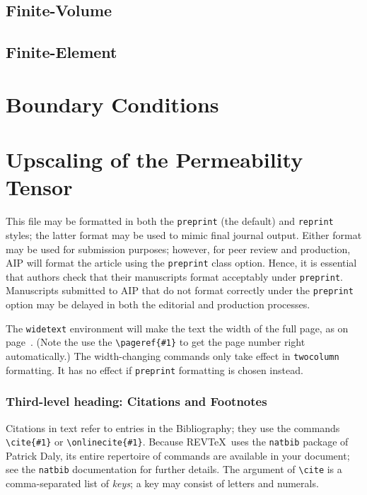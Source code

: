 \documentclass[%
 aip,
 jmp,%
 amsmath,amssymb,
 reprint,%
]{revtex4-1}
\begin{document}
\subsection{\label{sec:finite_volume}Finite-Volume}

\subsection{\label{sec:finite_element}Finite-Element}

\section{\label{sec:boundary_conditions}Boundary Conditions}

\section{\label{sec:upscaling}Upscaling of the Permeability Tensor}

This file may be formatted in both the \texttt{preprint} (the default) and
\texttt{reprint} styles; the latter format may be used to 
mimic final journal output. Either format may be used for submission
purposes; however, for peer review and production, AIP will format the
article using the \texttt{preprint} class option. Hence, it is
essential that authors check that their manuscripts format acceptably
under \texttt{preprint}. Manuscripts submitted to AIP that do not
format correctly under the \texttt{preprint} option may be delayed in
both the editorial and production processes.

The \texttt{widetext} environment will make the text the width of the
full page, as on page~\pageref{eq:wideeq}. (Note the use the
\verb+\pageref{#1}+ to get the page number right automatically.) The
width-changing commands only take effect in \texttt{twocolumn}
formatting. It has no effect if \texttt{preprint} formatting is chosen
instead.

\subsubsection{\label{sec:level3}Third-level heading: Citations and Footnotes}

Citations in text refer to entries in the Bibliography;
they use the commands \verb+\cite{#1}+ or \verb+\onlinecite{#1}+. 
Because REV\TeX\ uses the \verb+natbib+ package of Patrick Daly, 
its entire repertoire of commands are available in your document;
see the \verb+natbib+ documentation for further details.
The argument of \verb+\cite+ is a comma-separated list of \emph{keys};
a key may consist of letters and numerals. 
\end{document}
